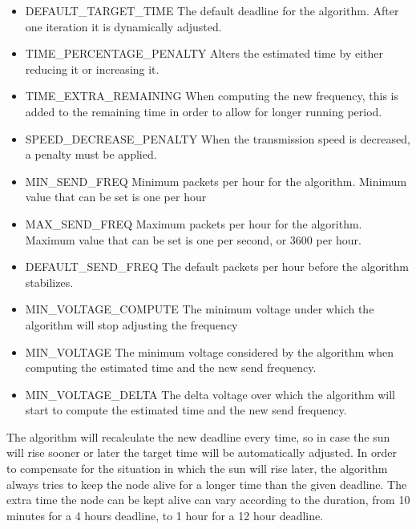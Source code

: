 \begin{itemize}
    \item DEFAULT\_TARGET\_TIME The default deadline for the algorithm. After one iteration it is
        dynamically adjusted.
    \item TIME\_PERCENTAGE\_PENALTY Alters the estimated time by either reducing it or increasing
        it.
    \item TIME\_EXTRA\_REMAINING When computing the new frequency, this is added to the remaining
        time in order to allow for longer running period.
    \item SPEED\_DECREASE\_PENALTY When the transmission speed is decreased, a penalty must be
        applied.
    \item MIN\_SEND\_FREQ  Minimum packets per hour for the algorithm. Minimum value that can be
        set is one per hour
    \item MAX\_SEND\_FREQ  Maximum packets per hour for the algorithm. Maximum value that can be
        set is one per second, or 3600 per hour.
    \item DEFAULT\_SEND\_FREQ The default packets per hour before the algorithm stabilizes.
    \item MIN\_VOLTAGE\_COMPUTE The minimum voltage under which the algorithm will stop adjusting
        the frequency
    \item MIN\_VOLTAGE The minimum voltage considered by the algorithm when computing the estimated
        time and the new send frequency.
    \item MIN\_VOLTAGE\_DELTA The delta voltage over which the algorithm will start to compute the
        estimated time and the new send frequency.
\end{itemize}


The algorithm will recalculate the new deadline every time, so in case the sun will rise sooner or later the
target time will be automatically adjusted. In order to compensate for the situation in which the
sun will rise later, the algorithm always tries to keep the node alive for a
longer time than the given deadline. The extra time the node can be kept alive can vary according
to the duration, from 10 minutes for a 4 hours deadline, to 1 hour for a 12 hour deadline.


